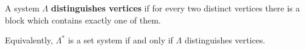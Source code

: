 A system $\Lambda$ \textbf{distinguishes vertices} if for every two distinct vertices there is a block which contains exactly one of them.

Equivalently, $\Lambda^*$ is a set system if and only if $\Lambda$ distinguishes vertices.
